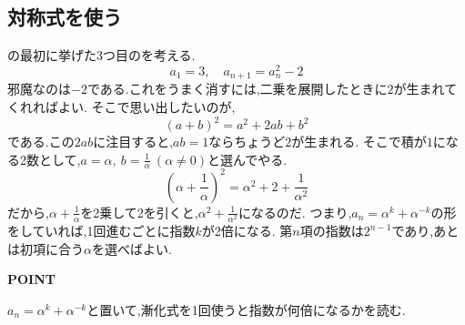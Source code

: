 \subsection{対称式を使う}\label{節：対称式を使う}
の最初に挙げた3つ目のを考える.
\[
  a_1=3, \quad a_{n+1}=a_n^2-2
\]
邪魔なのは$-2$である.これをうまく消すには,二乗を展開したときに$2$が生まれてくれればよい.
そこで思い出したいのが,
\[
  (a+b)^2=a^2+2ab+b^2
\]
である.この$2ab$に注目すると,$ab=1$ならちょうど$2$が生まれる.
そこで積が$1$になる2数として,$a=\alpha,\ b=\frac{1}{\alpha}\ (\alpha\ne0)$と選んでやる.
\[
  \left(\alpha+\frac{1}{\alpha}\right)^2=\alpha^2+2+\frac{1}{\alpha^2}
\]
だから,$\alpha+\frac1\alpha$を2乗して2を引くと,$\alpha^2+\frac{1}{\alpha^2}$になるのだ.
つまり,$a_n=\alpha^{k}+\alpha^{-k}$の形をしていれば,1回進むごとに指数$k$が2倍になる.
第$n$項の指数は$2^{n-1}$であり,あとは初項に合う$\alpha$を選べばよい.

\begin{bookpoint}
  \textbf{POINT}\par
  $a_n=\alpha^{k}+\alpha^{-k}$と置いて,漸化式を1回使うと指数が何倍になるかを読む.
\end{bookpoint}


